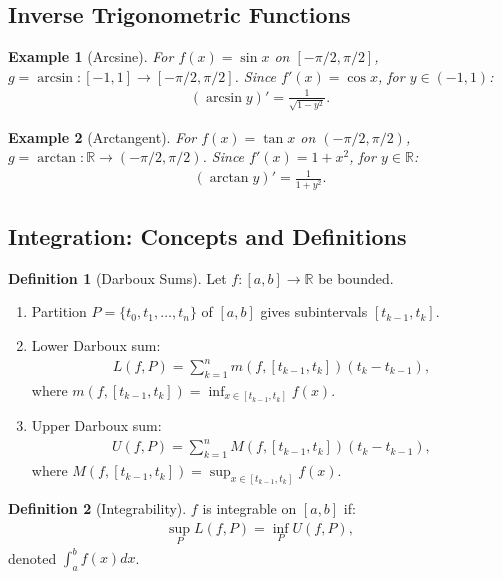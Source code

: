 \documentclass[9pt]{article}
\theoremstyle{definition}
\newtheorem{definition}{Definition}
\theoremstyle{plain}
\newtheorem{example}{Example}
\begin{document}
\subsection*{Inverse Trigonometric Functions}
\begin{example}[Arcsine]
For $ f(x) = \sin x $ on $ [-\pi/2, \pi/2] $, $ g = \arcsin : [-1, 1] \to [-\pi/2, \pi/2] $. Since $ f'(x) = \cos x $, for $ y \in (-1, 1) $:
\begin{align}
(\arcsin y)' = \frac{1}{\sqrt{1-y^2}}.
\end{align}
\end{example}

\begin{example}[Arctangent]
For $ f(x) = \tan x $ on $ (-\pi/2, \pi/2) $, $ g = \arctan : \mathbb{R} \to (-\pi/2, \pi/2) $. Since $ f'(x) = 1 + x^2 $, for $ y \in \mathbb{R} $:
\begin{align}
(\arctan y)' = \frac{1}{1 + y^2}.
\end{align}
\end{example}

\subsection*{Integration: Concepts and Definitions}
\begin{definition}[Darboux Sums]
Let $ f : [a, b] \to \mathbb{R} $ be bounded.
\begin{enumerate}
    \item Partition $ P = \{t_0, t_1, \ldots, t_n\} $ of $ [a, b] $ gives subintervals $ [t_{k-1}, t_k] $.
    \item Lower Darboux sum:
    \begin{align}
    L(f, P) = \sum_{k=1}^n m(f, [t_{k-1}, t_k])(t_k - t_{k-1}),
    \end{align}
    where $ m(f, [t_{k-1}, t_k]) = \inf_{x \in [t_{k-1}, t_k]} f(x) $.
    \item Upper Darboux sum:
    \begin{align}
    U(f, P) = \sum_{k=1}^n M(f, [t_{k-1}, t_k])(t_k - t_{k-1}),
    \end{align}
    where $ M(f, [t_{k-1}, t_k]) = \sup_{x \in [t_{k-1}, t_k]} f(x) $.
\end{enumerate}
\end{definition}

\begin{definition}[Integrability]
$ f $ is integrable on $ [a, b] $ if:
\begin{align}
\sup_P L(f, P) = \inf_P U(f, P),
\end{align}
denoted $ \int_a^b f(x) dx $.
\end{definition}
\end{document}
